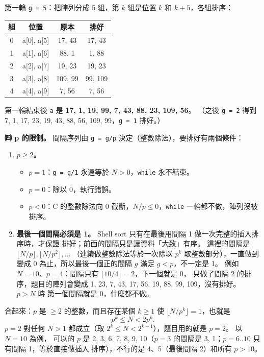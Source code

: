 \begin{pastsoln}
第一輪 \texttt{g = 5}：把陣列分成 5 組，第 $k$ 組是位置 $k$ 和 $k+5$，各組排序：
\begin{center}
\begin{tabular}{cccc}
\toprule
組 & 位置 & 原本 & 排好 \\
\midrule
0 & a[0], a[5] & 17, 43 & 17, 43 \\
1 & a[1], a[6] & 88, 1 & 1, 88 \\
2 & a[2], a[7] & 19, 23 & 19, 23 \\
3 & a[3], a[8] & 109, 99 & 99, 109 \\
4 & a[4], a[9] & 7, 56 & 7, 56 \\
\bottomrule
\end{tabular}
\end{center}
第一輪結束後 \texttt{a} 是 \textbf{17, 1, 19, 99, 7, 43, 88, 23, 109, 56}。 （之後 \texttt{g = 2}
得到 7, 1, 17, 23, 19, 43, 88, 56, 109, 99，\texttt{g = 1} 排好。）

\textbf{㈣ p 的限制。} 間隔序列由 \texttt{g = g/p} 決定（整數除法），要排好有兩個條件：
\begin{enumerate}
\item \textbf{$p \ge 2$。}
\begin{itemize}
\item $p = 1$：\texttt{g = g/1} 永遠等於 $N > 0$，\texttt{while} 永不結束。
\item $p = 0$：除以 0，執行錯誤。
\item $p < 0$：C 的整數除法向 0 截斷，$N/p \le 0$，\texttt{while} 一輪都不做，陣列沒被排序。
\end{itemize}
\item \textbf{最後一個間隔必須是 1。} Shell sort 只有在最後用間隔 1 做一次完整的插入排序時，才保證
排好；前面的間隔只是讓資料「大致」有序。 這裡的間隔是 $\lfloor N/p \rfloor, \lfloor N/p^2 \rfloor, \dots$
（連續做整數除法等於一次除以 $p^k$ 取整數部分），一直做到變成 0 為止，所以最後一個正的間隔 $g$
滿足 $g < p$，不一定是 1。 例如 $N = 10$、$p = 4$：間隔只有 $\lfloor 10/4 \rfloor = 2$，下一個就是 0，
只做了間隔 2 的排序，題目的陣列會變成 1, 23, 7, 43, 17, 56, 19, 88, 99, 109，沒有排好。 $p > N$ 時
第一個間隔就是 0，什麼都不做。
\end{enumerate}
合起來：$p$ 是 $\ge 2$ 的整數，而且存在某個 $k \ge 1$ 使 $\lfloor N/p^k \rfloor = 1$，也就是
\[
p^k \le N < 2p^k.
\]
$p = 2$ 對任何 $N > 1$ 都成立（取 $2^k \le N < 2^{k+1}$），題目用的就是 $p = 2$。 以 $N = 10$ 為例，
可以的 $p$ 是 2, 3, 6, 7, 8, 9, 10（$p = 3$ 的間隔是 3, 1；$p = 6..10$ 只有間隔 1，等於直接做插入
排序），不行的是 4、5（最後間隔 2）和所有 $p > 10$。
\end{pastsoln}
